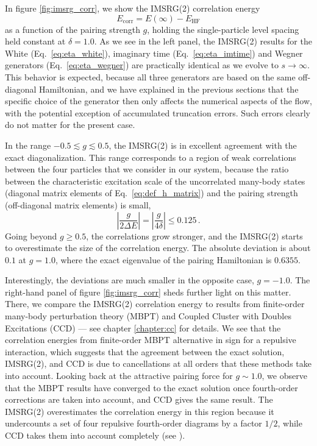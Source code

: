In figure \ref{fig:imsrg_corr}, we show the IMSRG(2) correlation energy
\begin{equation}
  E_\text{corr} = E(\infty) - E_\text{HF}
\end{equation}
as a function of the pairing strength $g$, holding the single-particle 
level spacing held constant at $\delta=1.0$. As we see in the left panel, 
the IMSRG(2) results for the White (Eq.~\eqref{eq:eta_white}), imaginary
time (Eq.~\eqref{eq:eta_imtime}) and Wegner generators (Eq.~\eqref{eq:eta_wegner})
are practically identical as we evolve to $s\to\infty$. This behavior
is expected, because all three generators are based on the same off-diagonal
Hamiltonian, and we have explained in the previous sections that the 
specific choice of the generator then only affects the numerical aspects
of the flow, with the potential exception of accumulated truncation
errors. Such errors clearly do not matter for the present case.

In the range $-0.5\lesssim g \lesssim 0.5$, the IMSRG(2) is in excellent 
agreement with the exact diagonalization. This range corresponds to 
a region of weak correlations between the four particles that we 
consider in our system, because the ratio between the characteristic excitation
scale of the uncorrelated many-body states (diagonal matrix elements of 
Eq.~\eqref{eq:def_h_matrix}) and the pairing strength (off-diagonal matrix 
elements) is small,
\begin{equation}
  \left|\frac{g}{2\Delta E}\right| = \left|\frac{g}{4\delta}\right| \leq 0.125\,.
\end{equation}
Going beyond $g\geq 0.5$, the correlations grow stronger, and the IMSRG(2) 
starts to overestimate the size of the correlation energy. The absolute 
deviation is about $0.1$ at $g=1.0$, where the exact eigenvalue of the pairing 
Hamiltonian is $0.6355$. 

Interestingly, the deviations are much smaller in the opposite case, $g=-1.0$. The 
right-hand panel of figure \ref{fig:imsrg_corr} sheds further light on this matter.
There, we compare the IMSRG(2) correlation energy to results from finite-order
many-body perturbation theory (MBPT) and Coupled Cluster with Doubles Excitations
(CCD) --- see chapter \ref{chapter:cc} for details. We see that the correlation
energies from finite-order MBPT alternative in sign for a repulsive interaction,
which suggests that the agreement between the exact solution, IMSRG(2), and CCD
is due to cancellations at all orders that these methods take into account.
Looking back at the attractive pairing force for $g\sim1.0$, we observe that 
the MBPT results have converged to the exact solution once fourth-order 
corrections are taken into account, and CCD gives the same result. The
IMSRG(2) overestimates the correlation energy in this region because it 
undercounts a set of four repulsive fourth-order diagrams by a factor $1/2$,
while CCD takes them into account completely 
(see \cite{Hergert:2016jk,Parzuchowski:2016pi}).

